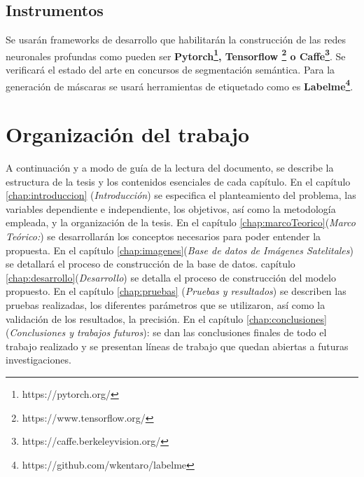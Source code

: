 \subsection{Instrumentos}
Se usarán frameworks de desarrollo que habilitarán la construcción de las redes neuronales profundas como pueden ser \textbf{Pytorch\footnote{https://pytorch.org/}, Tensorflow \footnote{https://www.tensorflow.org/} o Caffe\footnote{https://caffe.berkeleyvision.org/}}. Se verificará el estado del arte en concursos de segmentación semántica. Para la generación de máscaras se usará herramientas de etiquetado como es \textbf{Labelme\footnote{https://github.com/wkentaro/labelme}}.

\section{Organización del trabajo}
A continuación y a modo de guía de la lectura del documento, se describe la estructura de la tesis y los contenidos esenciales de cada capítulo.
En el capítulo \ref{chap:introduccion} (\textit{Introducción}) se especifica el planteamiento del problema, las variables dependiente e independiente, los objetivos, así como la metodología empleada, y la organización de la tesis. En el capítulo \ref{chap:marcoTeorico}(\textit{Marco Teórico:}) se desarrollarán los conceptos necesarios para poder entender la propuesta. En el capítulo \ref{chap:imagenes}(\textit{Base de datos de Imágenes Satelitales}) se detallará el proceso de construcción de la base de datos. capítulo \ref{chap:desarrollo}(\textit{Desarrollo}) se detalla el proceso de construcción del modelo propuesto. En el capítulo \ref{chap:pruebas} (\textit{Pruebas y resultados}) se describen las pruebas realizadas, los diferentes parámetros que se utilizaron, así como la validación de los resultados, la precisión. En el capítulo \ref{chap:conclusiones} (\textit{Conclusiones y trabajos futuros}): se dan las conclusiones finales de todo el trabajo realizado y se presentan líneas de trabajo que quedan abiertas a futuras investigaciones.


